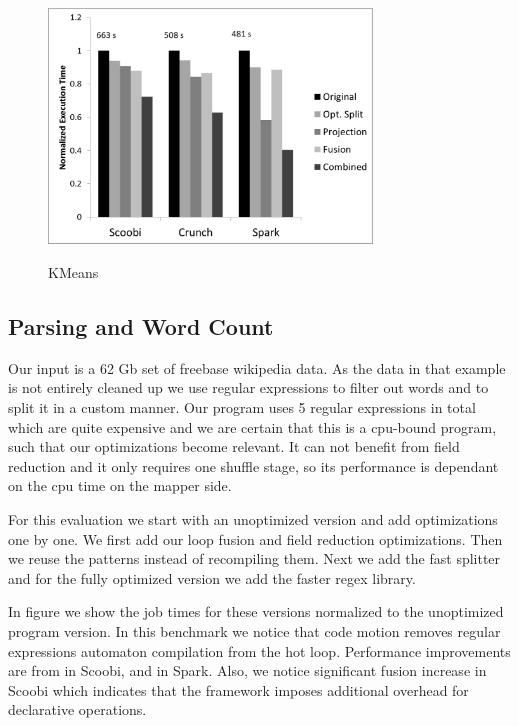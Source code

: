 \begin{figure}[!hbt]
    \includegraphics[width=8.6cm]{figures/tpch}
    \label{fig:tpch}\\%
   \caption{KMeans}
\end{figure}

\subsection{Parsing and Word Count}
\label{subsec:parsing-word-count}
Our input is a 62 Gb set of freebase wikipedia data. As the data in that example is not entirely cleaned up we use regular expressions to filter out words and to split it in a custom manner. Our program uses 5 regular expressions in total which are quite expensive and we are certain that this is a cpu-bound program, such that our optimizations become relevant.
It can not benefit from field reduction and it only requires one shuffle stage, so its performance is dependant on the cpu time on the mapper side. 

For this evaluation we start with an unoptimized version and add optimizations one by one. We first add our loop fusion and field reduction optimizations. Then we reuse the patterns instead of recompiling them. Next we add the fast splitter and for the fully optimized version we add the faster regex library. 

In figure \todo{\ref{}} we show the job times for these versions normalized to the unoptimized program version. In this benchmark we notice that code motion removes regular expressions automaton compilation from the hot loop. Performance improvements are from  in Scoobi,  and in Spark. Also, we notice significant fusion increase in Scoobi which indicates that the framework imposes additional overhead for declarative operations. 

